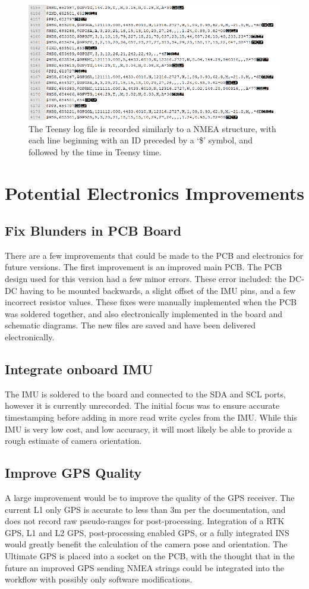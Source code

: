  \begin{figure}[H]
 	\centering
 	\includegraphics[scale = 0.7]{../figures/logfileend.png}
 	\caption{The Teensy log file is recorded similarly to a NMEA structure, with each line beginning with an ID preceded by a `\$' symbol, and followed by the time in Teensy time.}
 	\label{fig:nmea}
 \end{figure}

\section{Potential Electronics Improvements}
\subsection{Fix Blunders in PCB Board}
There are a few improvements that could be made to the PCB and electronics for future versions.  The first improvement is an improved main PCB.  The PCB design used for this version had a few minor errors.  These error included: the DC-DC having to be mounted backwards, a slight offset of the IMU pins, and a few incorrect resistor values.  These fixes were manually implemented when the PCB was soldered together, and also electronically implemented in the board and schematic diagrams.  The new files are saved and have been delivered electronically.  
\subsection{Integrate onboard IMU}
The IMU is soldered to the board and connected to the SDA and SCL ports, however it is currently unrecorded.  The initial focus was to ensure accurate timestamping before adding in more read write cycles from the IMU.  While this IMU is very low cost, and low accuracy, it will most likely be able to provide a rough estimate of camera orientation.  
\subsection{Improve GPS Quality}
A large improvement would be to improve the quality of the GPS receiver.  The current L1 only GPS is accurate to less than 3m per the documentation, and does not record raw pseudo-ranges for post-processing.  Integration of a RTK GPS, L1 and L2 GPS, post-processing enabled GPS, or a fully integrated INS would greatly benefit the calculation of the camera pose and orientation.  The Ultimate GPS is placed into a socket on the PCB, with the thought that in the future an improved GPS sending NMEA strings could be integrated into the workflow with possibly only software modifications.
